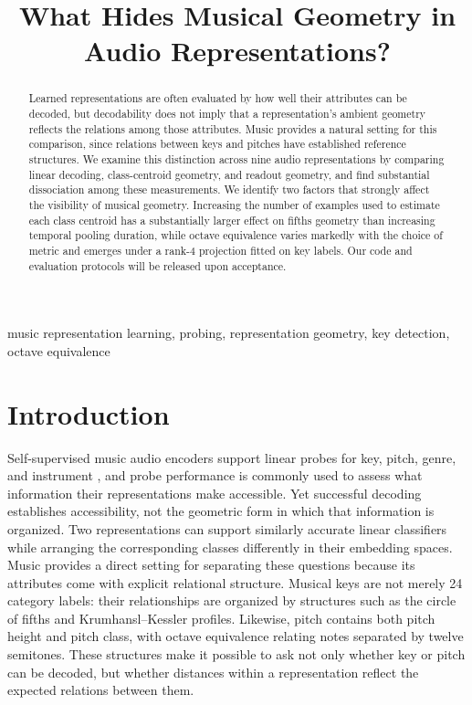\documentclass{article}
\title{What Hides Musical Geometry in Audio Representations?}
\begin{document}
\ninept
\maketitle

\begin{abstract}
Learned representations are often evaluated by how well their attributes can be decoded, but decodability does not imply that a representation’s ambient geometry reflects the relations among those attributes. Music provides a natural setting for this comparison, since relations between keys and pitches have established reference structures. We examine this distinction across nine audio representations by comparing linear decoding, class-centroid geometry, and readout geometry, and find substantial dissociation among these measurements. We identify two factors that strongly affect the visibility of musical geometry. Increasing the number of examples used to estimate each class centroid has a substantially larger effect on fifths geometry than increasing temporal pooling duration, while octave equivalence varies markedly with the choice of metric and emerges under a rank-4 projection fitted on key labels. Our code and evaluation protocols will be released upon acceptance.
\end{abstract}

\begin{keywords}
music representation learning, probing, representation geometry, key detection,
octave equivalence
\end{keywords}

\section{Introduction}
\label{sec:intro}

Self-supervised music audio encoders support linear probes
\cite{probes} for key, pitch, genre, and instrument \cite{mert,marble}, and probe performance is commonly used to assess what information their representations make accessible. Yet successful
decoding establishes accessibility, not the geometric form in which that
information is organized. Two representations can support similarly accurate linear classifiers while arranging the corresponding classes differently in their embedding spaces. Music provides a direct setting for separating these questions because its attributes come with explicit relational structure. Musical keys are not merely 24 category labels: their relationships are organized by structures such as the circle of fifths and Krumhansl--Kessler profiles. Likewise, pitch contains both pitch height and pitch class, with octave equivalence relating notes separated by twelve semitones. These structures make it possible to ask not only whether key or pitch can be decoded, but whether distances within a representation reflect the expected relations between them.
\end{document}
